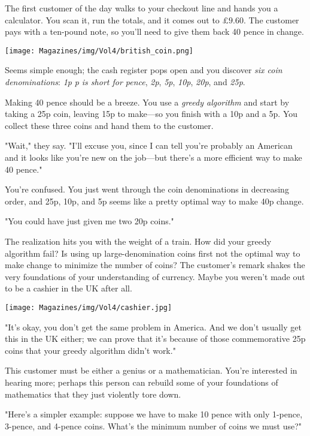 \documentclass{article}
\begin{document}
\begin{multicols}{3}
The first customer of the day walks to your checkout line and hands you a calculator. You scan it, run the totals, and it comes out to $\pounds 9.60$. The customer pays with a ten-pound note, so you'll need to give them back 40 pence in change.
\begin{center}
\texttt{[image: Magazines/img/Vol4/british\_coin.png]}
\end{center}
Seems simple enough; the cash register pops open and you discover \textit{six coin denominations}: \textit{1p} \textit{p is short for pence}, \textit{2p}, \textit{5p}, \textit{10p}, \textit{20p}, and \textit{25p}.

Making 40 pence should be a breeze. You use a \textit{greedy algorithm} and start by taking a 25p coin, leaving 15p to make—so you finish with a 10p and a 5p. You collect these three coins and hand them to the customer.

"Wait," they say. "I'll excuse you, since I can tell you're probably an American and it looks like you're new on the job—but there's a more efficient way to make 40 pence."

You're confused. You just went through the coin denominations in decreasing order, and 25p, 10p, and 5p seems like a pretty optimal way to make 40p change.

"You could have just given me two 20p coins."

The realization hits you with the weight of a train. How did your greedy algorithm fail? Is using up large-denomination coins first not the optimal way to make change to minimize the number of coins? The customer's remark shakes the very foundations of your understanding of currency. Maybe you weren't made out to be a cashier in the UK after all.

\begin{center}
\texttt{[image: Magazines/img/Vol4/cashier.jpg]}
\end{center}

"It's okay, you don't get the same problem in America. And we don't usually get this in the UK either; we can prove that it's because of those commemorative 25p coins that your greedy algorithm didn't work."

This customer must be either a genius or a mathematician. You're interested in hearing more; perhaps this person can rebuild some of your foundations of mathematics that they just violently tore down.

"Here's a simpler example: suppose we have to make 10 pence with only 1-pence, 3-pence, and 4-pence coins. What's the minimum number of coins we must use?"


\end{multicols}
\end{document}
